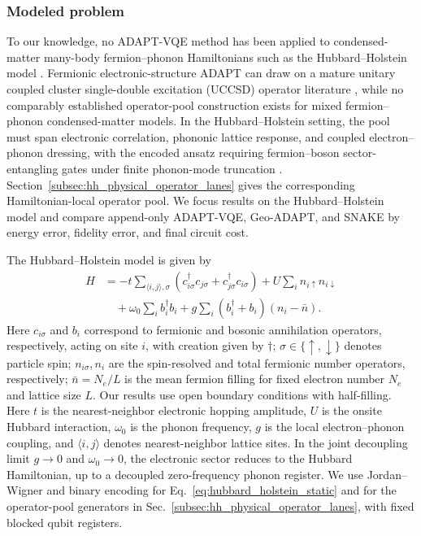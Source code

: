\documentclass[
  reprint,
  amsmath,
  amssymb,
  aps,
  pra,
  nofootinbib,
  superscriptaddress,
  floatfix
]{revtex4-2}
\begin{document}
\subsubsection{Modeled problem}
To our knowledge, no ADAPT-VQE method has been applied to condensed-matter many-body fermion--phonon Hamiltonians such as the Hubbard--Holstein model \cite{Macridin2018,Li2023,Denner2023,Majland2024vADAPT}. Fermionic electronic-structure ADAPT can draw on a mature unitary coupled cluster single-double excitation (UCCSD) operator literature \cite{Romero2018UCC,Grimsley2019}, while no comparably established operator-pool construction exists for mixed fermion--phonon condensed-matter models. In the Hubbard--Holstein setting, the pool must span electronic correlation, phononic lattice response, and coupled electron--phonon dressing, with the encoded ansatz requiring fermion--boson sector-entangling gates under finite phonon-mode truncation \cite{Hubbard1963,Holstein1959a,Holstein1959b}. Section~\ref{subsec:hh_physical_operator_lanes} gives the corresponding Hamiltonian-local operator pool. We focus results on the Hubbard--Holstein model and compare append-only ADAPT-VQE, Geo-ADAPT, and SNAKE by energy error, fidelity error, and final circuit cost.


The Hubbard--Holstein model is given by
\begin{align}
H
&=-t\sum_{\langle i,j\rangle,\sigma}
(c_{i\sigma}^{\dagger}c_{j\sigma}+c_{j\sigma}^{\dagger}c_{i\sigma})
+U\sum_i n_{i\uparrow}n_{i\downarrow}
\nonumber\\
&\quad+\omega_0\sum_i b_i^\dagger b_i
+g\sum_i(b_i^\dagger+b_i)(n_i-\bar n).
\label{eq:hubbard_holstein_static}
\end{align}
Here \(c_{i\sigma}\) and \(b_i\) correspond to fermionic and bosonic annihilation operators, respectively, acting on site $i$, with creation given by $\dagger$; $\sigma \in\{\uparrow, \downarrow\}$ denotes particle spin;
\(n_{i\sigma}, n_i\) are the spin-resolved and total fermionic number operators, respectively; \(\bar n=N_e/L\) is the mean fermion filling
for fixed electron number \(N_e\) and lattice size \(L\). Our results use open boundary conditions with half-filling.
Here \(t\) is the nearest-neighbor electronic hopping amplitude, \(U\) is the onsite Hubbard interaction, \(\omega_0\) is the phonon frequency, \(g\) is the local electron--phonon coupling, and \(\langle i,j\rangle\) denotes nearest-neighbor lattice sites.
In the joint decoupling limit $g\to0$ and $\omega_0\to0$, the electronic sector reduces to the Hubbard Hamiltonian, up to a decoupled zero-frequency phonon register. We use Jordan--Wigner and binary encoding for Eq.~\eqref{eq:hubbard_holstein_static} and for the operator-pool generators in Sec.~\ref{subsec:hh_physical_operator_lanes}, with fixed blocked qubit registers.
\end{document}
